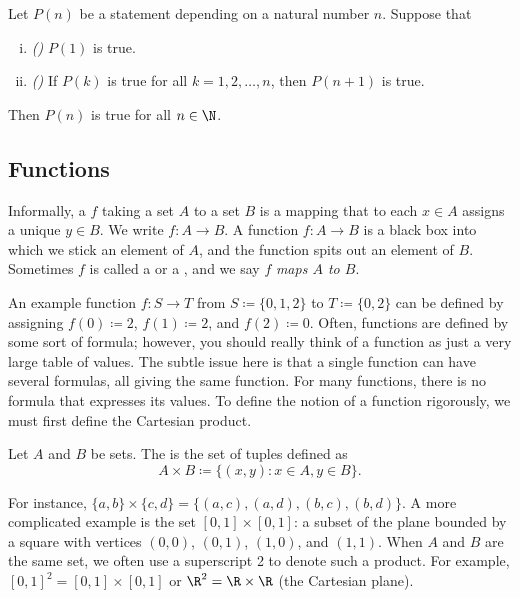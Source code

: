 \begin{thm}
Let $P(n)$ be a statement depending on a natural number $n$.  Suppose that
\begin{enumerate}[(i)]
\item \emph{()} $P(1)$ is true.
\item \emph{()} If $P(k)$ is true for all $k = 1,2,\ldots,n$, then $P(n+1)$ is true.
\end{enumerate}
Then $P(n)$ is true for all $n \in \N$.
\end{thm}

\subsection{Functions}

Informally,
a \emph{}
$f$ taking a set $A$ to a set $B$
is a mapping that to each $x \in A$ assigns a unique $y \in B$.  We write
$f \colon A \to B$.
A function $f
\colon A \to B$ is
a black box into which we stick an element of $A$,
and the function
spits out an element of $B$.
Sometimes $f$ is called a \emph{} or a
\emph{},
and we say $f$ \emph{maps $A$ to $B$}.

An example function 
$f \colon S \to T$ from $S \coloneqq \{ 0, 1, 2 \}$ to $T \coloneqq \{ 0, 2 \}$
can be defined
by assigning $f(0) \coloneqq 2$, $f(1) \coloneqq 2$, and $f(2) \coloneqq 0$.
%
Often, functions are defined by some sort of
formula; however, you should really think of a function as just a very large
table of values.
The subtle issue here is that a single function can have several 
formulas, all giving the same function.
For many functions, there is
no formula that expresses its values.
To define the notion of a function rigorously,
we must first define the Cartesian product.

\begin{defn}
Let $A$ and $B$ be sets.  The \emph{}
is the set of tuples defined as
\begin{equation*}
A \times B \coloneqq
\bigl\{ (x,y) : x \in A, y \in B \bigr\} .
\end{equation*}
\end{defn}

For instance, $\{ a,b \} \times \{ c , d\} =
\bigl\{
(a,c), (a,d), (b,c), (b,d)
\bigr\}$.
A more complicated example is the set $[0,1] \times [0,1]$: a subset of the
plane bounded by a square with vertices $(0,0)$, $(0,1)$, $(1,0)$, and $(1,1)$.
When $A$ and $B$ are the same set, we often use a superscript 2 to denote
such a product.  For example, $[0,1]^2 = 
[0,1] \times [0,1]$ or $\R^2 = \R \times \R$ (the Cartesian plane).

